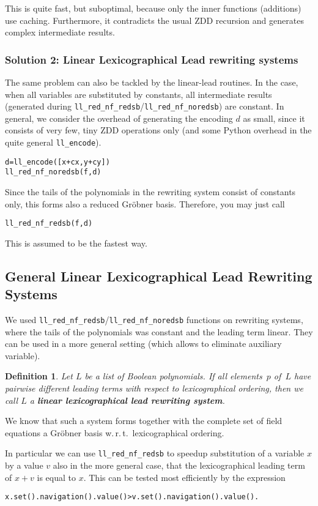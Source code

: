 \documentclass[]{article}
\newcommand{\Groebner}{Gr\"{o}bner\xspace}
\newcounter{thm}
\newtheorem{definition}[thm]{Definition}
\begin{document}
This is quite fast, but suboptimal, because only the inner functions (additions) use caching.
%
Furthermore, it contradicts the usual ZDD recursion and generates complex intermediate results.

\subsubsection{Solution 2: Linear Lexicographical Lead rewriting systems}
The same problem can also be tackled by the linear-lead routines. In the case, when
all variables are substituted by  constants, all intermediate results
(generated during \lstinline|ll_red_nf_redsb|/\lstinline|ll_red_nf_noredsb|) are constant.
In general, we consider the overhead of generating the encoding $d$ as small, 
since it consists of very few, tiny ZDD operations only (and some Python overhead in the quite general \lstinline|ll_encode|).
\begin{lstlisting}
d=ll_encode([x+cx,y+cy])
ll_red_nf_noredsb(f,d)
\end{lstlisting}
%
%
Since the tails of the polynomials in the rewriting system   consist of
constants only, this forms also a
reduced \Groebner basis. Therefore, you may just call
\begin{lstlisting}
ll_red_nf_redsb(f,d)   
\end{lstlisting}
%
This is assumed to be the fastest way.
%


\subsection{General Linear Lexicographical Lead Rewriting Systems}
\label{linear-lexicographical-lead-rewriting-systems}
We used \lstinline|ll_red_nf_redsb|/\lstinline|ll_red_nf_noredsb| functions on rewriting systems, where the tails of the polynomials was constant and the leading term linear.
They can be used in a more general setting (which allows to eliminate auxiliary variable).
\begin{definition}
Let $L$ be a list of Boolean polynomials.
If all elements~$p$ of~$L$ have pairwise different leading terms with respect to lexicographical ordering,
then we call $L$ a \textbf{linear lexicographical lead rewriting system}.
\end{definition}
We know that such a system forms together with the complete set of field
equations a \Groebner basis w.\,r.\,t.\ lexicographical ordering.

In particular we can use \lstinline|ll_red_nf_redsb| to speedup substitution of a variable $x$ by a value $v$ also in the more general case, that the lexicographical leading term of $x+v$ is equal to $x$.
This can be tested most efficiently by the expression
\begin{lstlisting}
x.set().navigation().value()>v.set().navigation().value().
\end{lstlisting}
\end{document}
